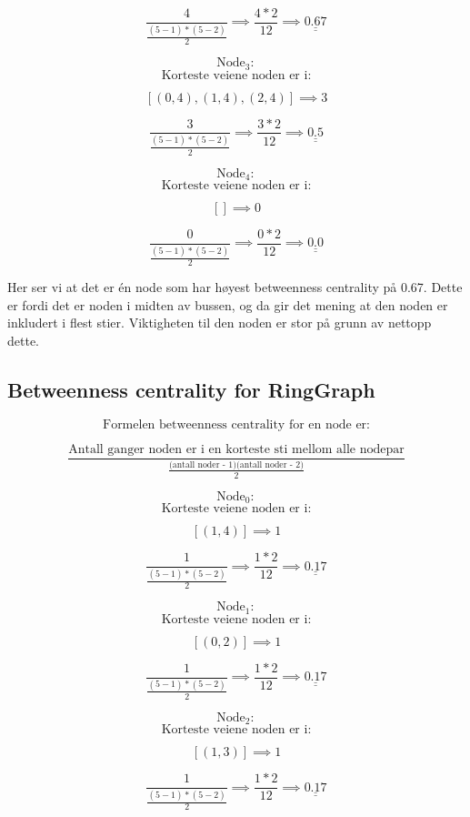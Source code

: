 \documentclass[11pt]{article}
\begin{document}
\[ \frac{4}{\frac{(5-1)*(5-2)}{2}} \implies \frac{4*2}{12} \implies \underline{\underline{ 0.67 }}\]

\[\text{Node}_3:\] \[\text{Korteste veiene noden er i:}\]

\[ [(0, 4), (1, 4), (2, 4)] \implies 3 \]

\[ \frac{3}{\frac{(5-1)*(5-2)}{2}} \implies \frac{3*2}{12} \implies \underline{\underline{ 0.5 }}\]

\[\text{Node}_4:\] \[\text{Korteste veiene noden er i:}\]

\[ [] \implies 0 \]

\[ \frac{0}{\frac{(5-1)*(5-2)}{2}} \implies \frac{0*2}{12} \implies \underline{\underline{ 0.0 }}\]

Her ser vi at det er én node som har høyest betweenness centrality på
0.67. Dette er fordi det er noden i midten av bussen, og da gir det
mening at den noden er inkludert i flest stier. Viktigheten til den
noden er stor på grunn av nettopp dette.

    \hypertarget{betweenness-centrality-for-ringgraph}{%
\subsection*{Betweenness centrality for
RingGraph}\label{betweenness-centrality-for-ringgraph}}

\[\text{Formelen betweenness centrality for en node er:}\]

\[\frac{\text{Antall ganger noden er i en korteste sti mellom alle nodepar}}{\frac{\text{(antall noder - 1)(antall noder - 2)}}{2}}\]

\[\text{Node}_0:\] \[\text{Korteste veiene noden er i:}\]

\[ [(1, 4)] \implies 1 \]

\[ \frac{1}{\frac{(5-1)*(5-2)}{2}} \implies \frac{1*2}{12} \implies \underline{\underline{ 0.17 }}\]

\[\text{Node}_1:\] \[\text{Korteste veiene noden er i:}\]

\[ [(0, 2)] \implies 1 \]

\[ \frac{1}{\frac{(5-1)*(5-2)}{2}} \implies \frac{1*2}{12} \implies \underline{\underline{ 0.17 }}\]

\[\text{Node}_2:\] \[\text{Korteste veiene noden er i:}\]

\[ [(1, 3)] \implies 1 \]

\[ \frac{1}{\frac{(5-1)*(5-2)}{2}} \implies \frac{1*2}{12} \implies \underline{\underline{ 0.17 }}\]
\end{document}
